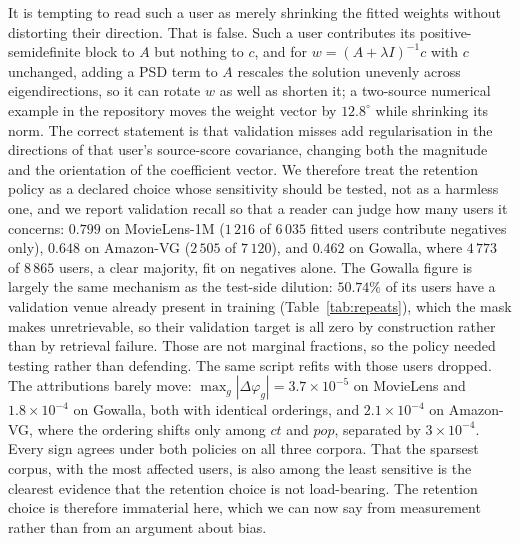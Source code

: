 \documentclass[pdflatex,sn-basic,Numbered]{sn-jnl}
\theoremstyle{plain}
\theoremstyle{definition}
\begin{document}
It is tempting to read such a user as merely shrinking the fitted weights
without distorting their direction. That is false. Such a user contributes its
positive-semidefinite block to $A$ but nothing to $c$, and for $w = (A + \lambda I)^{-1} c$ with $c$ unchanged, adding a PSD term to
$A$ rescales the solution unevenly across eigendirections, so it can rotate $w$
as well as shorten it; a two-source numerical example in the repository moves
the weight vector by $12.8^{\circ}$ while shrinking its norm. The correct
statement is that validation misses add regularisation in the directions of
that user's source-score covariance, changing both the magnitude and the
orientation of the coefficient vector. We therefore treat the retention policy
as a declared choice whose sensitivity should be tested, not as a harmless one,
and we report validation recall so that a reader can judge how many users it
concerns: $0.799$ on MovieLens-1M ($1\,216$ of $6\,035$ fitted users contribute
negatives only), $0.648$ on Amazon-VG ($2\,505$ of $7\,120$), and $0.462$ on
Gowalla, where $4\,773$ of $8\,865$ users, a clear majority, fit on negatives
alone. The Gowalla figure is largely the same mechanism as the test-side
dilution: $50.74\%$ of its users have a validation venue already present in
training (Table~\ref{tab:repeats}), which the mask makes unretrievable, so
their validation target is all zero by construction rather than by retrieval
failure. Those are not marginal fractions, so the policy needed testing rather
than defending. The same script refits with those users dropped. The
attributions barely move: $\max_g|\Delta\varphi_g| = 3.7\times10^{-5}$ on
MovieLens and $1.8\times10^{-4}$ on Gowalla, both with identical orderings, and
$2.1\times10^{-4}$ on Amazon-VG, where the ordering shifts only among $ct$ and
$pop$, separated by $3\times10^{-4}$. Every sign agrees under both policies on
all three corpora. That the sparsest corpus, with the most affected users, is
also among the least sensitive is the clearest evidence that the retention
choice is not load-bearing. The
retention choice is therefore immaterial here, which we can now say from
measurement rather than from an argument about bias.
\end{document}
